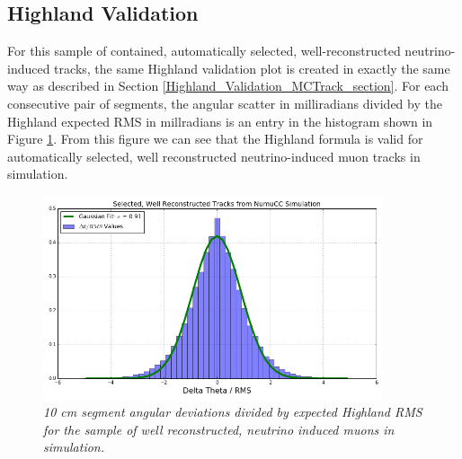 \subsection{Highland Validation}\label{Highland_Validation_MCBNBSelectedRecoTrack_section}
For this sample of contained, automatically selected, well-reconstructed neutrino-induced tracks, the same Highland validation plot is created in exactly the same way as described in Section \ref{Highland_Validation_MCTrack_section}. For each consecutive pair of segments, the angular scatter in milliradians divided by the Highland expected RMS in millradians is an entry in the histogram shown in Figure \ref{Highland_validation_MCBNBSelectedRecoTracks_fig}. From this figure we can see that the Highland formula is valid for automatically selected, well reconstructed neutrino-induced muon tracks in simulation.

\begin{figure}[ht!]
\begin{center}
\includegraphics[width=100mm]{Figures/Highland_validation_MCBNBSelectedRecoTrack.png}
\end{center}
\caption{\textit{10 cm segment angular deviations divided by expected Highland RMS for the sample of well reconstructed, neutrino induced muons in simulation.}}
\label{Highland_validation_MCBNBSelectedRecoTracks_fig}
\end{figure}